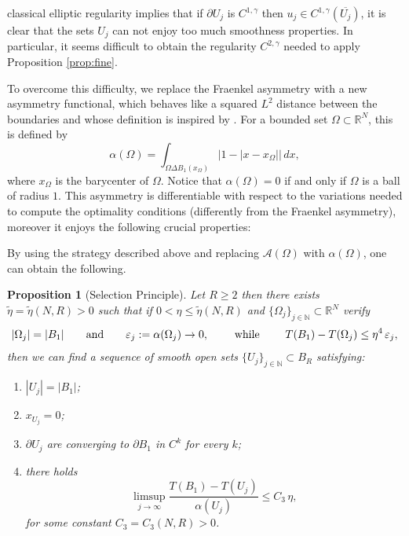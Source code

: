 \documentclass{amsart}
\newtheorem{proposition}[lemma]{Proposition}
\theoremstyle{definition}
\numberwithin{equation}{section}
\begin{document}
classical elliptic regularity implies that if \(\partial U_j\) is \(C^{1,\gamma}\) then \(u_j\in C^{1,\gamma}(\overline{U_j})\), it is clear that the sets \(U_j\) can not enjoy too much smoothness properties. In particular, it seems difficult to obtain the regularity $C^{2,\gamma}$ needed to apply Proposition \ref{prop:fine}. 
\par
To overcome this difficulty, we replace the Fraenkel asymmetry with a new asymmetry functional, which behaves like a squared \(L^2\) distance between the boundaries and whose definition is inspired by \cite{MR1205983}. 
For a bounded set \(\Omega\subset\mathbb{R}^N\), this is defined by
\[
\alpha(\Omega)=\int_{\Omega\Delta B_1(x_\Omega)} \big|1-|x-x_\Omega|\big|\, dx,
\]
where \(x_\Omega\) is the barycenter of \(\Omega\).
Notice that \(\alpha(\Omega)=0\) if and only if \(\Omega\) is a ball of radius \(1\).
This asymmetry is differentiable with respect to the variations needed to compute the optimality conditions (differently from the Fraenkel asymmetry), moreover it enjoys the following crucial properties:
By using the strategy described above and replacing $\mathcal{A}(\Omega)$ with $\alpha(\Omega)$, one can obtain the following.
\begin{proposition}[Selection Principle]
Let $R\ge 2$ then there exists $\widetilde \eta=\widetilde \eta(N,R)>0$ such that if \(0<\eta \le \widetilde \eta(N,R)\) and \(\{\Omega_j\}_{j\in\mathbb{N}}\subset\mathbb{R}^N\) verify
\[
|\Omega_j|=|B_1|\qquad\hbox{and}\qquad\varepsilon_j:=\alpha(\Omega_j)\to 0, \qquad  \mbox{  while } \qquad
T(B_1)-T(\Omega_j)\le \eta^4\, \varepsilon_j,
\]
then we can find a sequence of smooth open sets \(\{U_j\}_{j\in\mathbb{N}}\subset B_R\) satisfying: 
\begin{enumerate}
\item[(i)] \(|U_j|=|B_1|\); 
\item[(ii)] \(x_{U_j}=0\);
\item[(iii)] \(\partial U_j\) are converging to \(\partial B_1\) in \(C^k\) for every \(k\);
\item[(iv)] there holds
\[
\limsup_{j \to \infty}\frac{T(B_1)-T(U_j)}{\alpha(U_j)}\le C_3\,\eta,
\]
for some constant \(C_3=C_3(N,R)>0\).
\end{enumerate}
\end{proposition}
\end{document}
